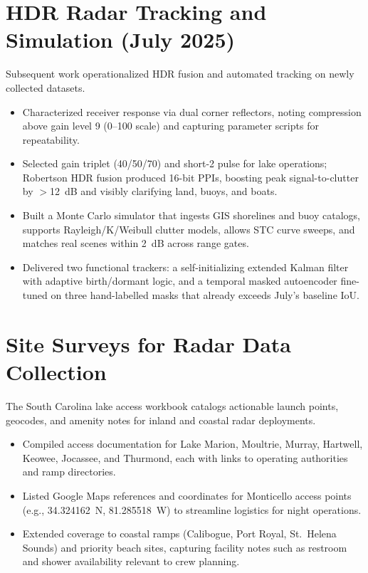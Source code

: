 \documentclass[12pt]{article}
\begin{document}
\section{HDR Radar Tracking and Simulation (July 2025)}
Subsequent work operationalized HDR fusion and automated tracking on newly collected datasets.\cite{phase2-hdr}
\begin{itemize}[leftmargin=*,nosep]
  \item Characterized receiver response via dual corner reflectors, noting compression above gain level 9 (0--100 scale) and capturing parameter scripts for repeatability.
  \item Selected gain triplet (40/50/70) and short-2 pulse for lake operations; Robertson HDR fusion produced 16-bit PPIs, boosting peak signal-to-clutter by $>$12~dB and visibly clarifying land, buoys, and boats.
  \item Built a Monte Carlo simulator that ingests GIS shorelines and buoy catalogs, supports Rayleigh/K/Weibull clutter models, allows STC curve sweeps, and matches real scenes within 2~dB across range gates.
  \item Delivered two functional trackers: a self-initializing extended Kalman filter with adaptive birth/dormant logic, and a temporal masked autoencoder fine-tuned on three hand-labelled masks that already exceeds July's baseline IoU.
\end{itemize}

\section{Site Surveys for Radar Data Collection}
The South Carolina lake access workbook catalogs actionable launch points, geocodes, and amenity notes for inland and coastal radar deployments.\cite{lake-access}
\begin{itemize}[leftmargin=*,nosep]
  \item Compiled access documentation for Lake Marion, Moultrie, Murray, Hartwell, Keowee, Jocassee, and Thurmond, each with links to operating authorities and ramp directories.
  \item Listed Google Maps references and coordinates for Monticello access points (e.g., 34.324162~N, 81.285518~W) to streamline logistics for night operations.
  \item Extended coverage to coastal ramps (Calibogue, Port Royal, St.~Helena Sounds) and priority beach sites, capturing facility notes such as restroom and shower availability relevant to crew planning.
\end{itemize}
\end{document}
